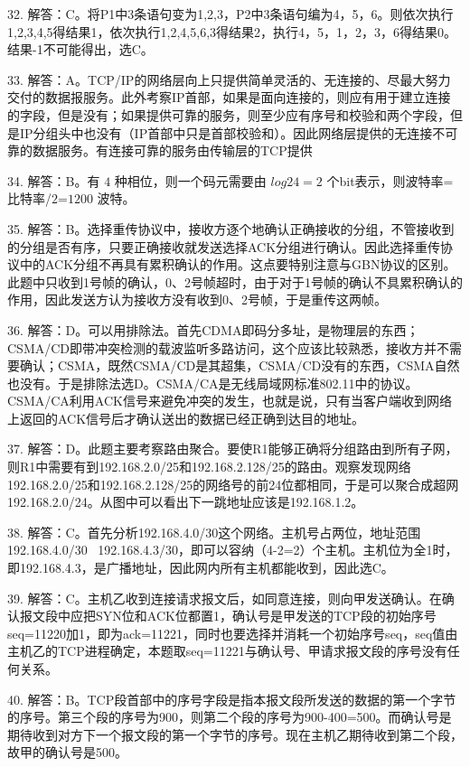 32. 解答：C。将P1中3条语句变为1,2,3，P2中3条语句编为4，5，6。则依次执行1,2,3,4,5得结果1，依次执行1,2,4,5,6,3得结果2，执行4，5，1，2，3，6得结果0。结果-1不可能得出，选C。

33. 解答：A。TCP/IP的网络层向上只提供简单灵活的、无连接的、尽最大努力交付的数据报服务。此外考察IP首部，如果是面向连接的，则应有用于建立连接的字段，但是没有；如果提供可靠的服务，则至少应有序号和校验和两个字段，但是IP分组头中也没有（IP首部中只是首部校验和）。因此网络层提供的无连接不可靠的数据服务。有连接可靠的服务由传输层的TCP提供

34. 解答：B。有 $4$ 种相位，则一个码元需要由 $log24=2$ 个bit表示，则波特率=比特率/$2$=$1200$ 波特。

35. 解答：B。选择重传协议中，接收方逐个地确认正确接收的分组，不管接收到的分组是否有序，只要正确接收就发送选择ACK分组进行确认。因此选择重传协议中的ACK分组不再具有累积确认的作用。这点要特别注意与GBN协议的区别。此题中只收到1号帧的确认，0、2号帧超时，由于对于1号帧的确认不具累积确认的作用，因此发送方认为接收方没有收到0、2号帧，于是重传这两帧。

36. 解答：D。可以用排除法。首先CDMA即码分多址，是物理层的东西；CSMA/CD即带冲突检测的载波监听多路访问，这个应该比较熟悉，接收方并不需要确认；CSMA，既然CSMA/CD是其超集，CSMA/CD没有的东西，CSMA自然也没有。于是排除法选D。CSMA/CA是无线局域网标准802.11中的协议。CSMA/CA利用ACK信号来避免冲突的发生，也就是说，只有当客户端收到网络上返回的ACK信号后才确认送出的数据已经正确到达目的地址。

37. 解答：D。此题主要考察路由聚合。要使R1能够正确将分组路由到所有子网，则R1中需要有到192.168.2.0/25和192.168.2.128/25的路由。观察发现网络192.168.2.0/25和192.168.2.128/25的网络号的前24位都相同，于是可以聚合成超网192.168.2.0/24。从图中可以看出下一跳地址应该是192.168.1.2。

38. 解答：C。首先分析192.168.4.0/30这个网络。主机号占两位，地址范围192.168.4.0/30~ 192.168.4.3/30，即可以容纳（4-2=2）个主机。主机位为全1时，即192.168.4.3，是广播地址，因此网内所有主机都能收到，因此选C。

39. 解答：C。主机乙收到连接请求报文后，如同意连接，则向甲发送确认。在确认报文段中应把SYN位和ACK位都置1，确认号是甲发送的TCP段的初始序号seq=11220加1，即为ack=11221，同时也要选择并消耗一个初始序号seq，seq值由主机乙的TCP进程确定，本题取seq=11221与确认号、甲请求报文段的序号没有任何关系。

40. 解答：B。TCP段首部中的序号字段是指本报文段所发送的数据的第一个字节的序号。第三个段的序号为900，则第二个段的序号为900-400=500。而确认号是期待收到对方下一个报文段的第一个字节的序号。现在主机乙期待收到第二个段，故甲的确认号是500。


